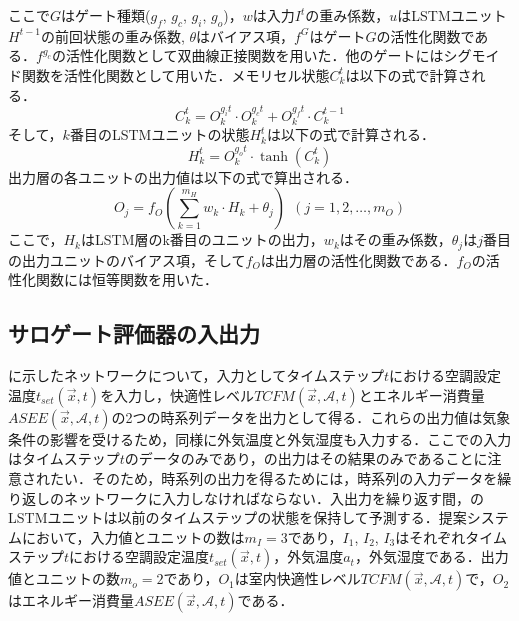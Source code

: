ここで$G$はゲート種類($g_f$, $g_c$, $g_i$, $g_o$)，$w$は入力$I^t$の重み係数，$u$はLSTMユニット$H^{t-1}$の前回状態の重み係数, $\theta$はバイアス項，$f^G$はゲート$G$の活性化関数である．$f^{g_c}$の活性化関数として双曲線正接関数を用いた．他のゲートにはシグモイド関数を活性化関数として用いた．メモリセル状態$C^t_k$は以下の式で計算される．
\begin{equation}
  C^t_k = O^{g_it}_k \cdot O^{g_c t}_k + O^{g_ft}_k \cdot C^{t-1}_k
\end{equation}
そして，$k$番目のLSTMユニットの状態$H^t_k$は以下の式で計算される．
\begin{equation}
  H^t_k = O^{g_ot}_k \cdot \tanh(C^t_k)
\end{equation}
出力層の各ユニットの出力値は以下の式で算出される．
\begin{equation}
  O_{j}  = f_{O} \left(\sum^{m_{H}}_{k=1} w_k \cdot H_k + \theta_{j} \right)~~(j=1, 2,\dotsc,m_{O}) \label{eq::fully_connected_output}
\end{equation}
ここで，$H_k$はLSTM層のk番目のユニットの出力，$w_k$はその重み係数，$\theta_{j}$は$j$番目の出力ユニットのバイアス項，そして$f_{O}$は出力層の活性化関数である．$f_{O}$の活性化関数には恒等関数を用いた．

\subsection{サロゲート評価器の入出力}
に示したネットワークについて，入力としてタイムステップ$t$における空調設定温度$t_{set}(\vec{x},t)$を入力し，快適性レベル$TCFM(\vec{x}, \mathcal{A}, t)$とエネルギー消費量$ASEE(\vec{x}, \mathcal{A}, t)$の2つの時系列データを出力として得る．これらの出力値は気象条件の影響を受けるため，同様に外気温度と外気湿度も入力する．ここでの入力はタイムステップ$t$のデータのみであり，の出力はその結果のみであることに注意されたい．そのため，時系列の出力を得るためには，時系列の入力データを繰り返しのネットワークに入力しなければならない．入出力を繰り返す間，のLSTMユニットは以前のタイムステップの状態を保持して予測する．提案システムにおいて，入力値とユニットの数は$m_{I}=3$であり，$I_1$, $I_2$, $I_3$はそれぞれタイムステップ$t$における空調設定温度$t_{set}(\vec{x},t)$，外気温度$a_t$，外気湿度である．出力値とユニットの数$m_{o}=2$であり，$O_1$は室内快適性レベル$TCFM(\vec{x}, \mathcal{A}, t)$で，$O_2$はエネルギー消費量$ASEE(\vec{x}, \mathcal{A}, t)$である．

